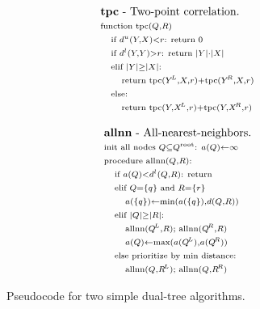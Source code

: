 \documentclass{article}
\newcommand{\disthrectmin}{d^{l}}
\newcommand{\disthrectmax}{d^{u}}
\newcommand{\dist}[2]{d(#1,#2)}
\newcommand{\kdroot}[1]{#1^{\text{\rm root}}}
\newcommand{\kdleft}[1]{#1^{\!L}}
\newcommand{\kdright}[1]{#1^{\!R}}
\newcommand{\X}{\\ \scriptstyle}
\newcommand{\x}{\\ \hspace{0.13in} \scriptstyle}
\newcommand{\xx}{\\ \hspace{0.26in} \scriptstyle}
\begin{document}
\begin{figure}
  \vspace{-1.89in}
  \hspace{1.8in}
  \begin{minipage}{3.88in}
    \begin{minipage}{1.8in}
      \begin{displaymath}
        \begin{array}{l}
          \text{{\bf tpc} - Two-point correlation.}
          \X \text{function tpc}(Q, R)
          \x \text{if }\disthrectmax(Y, X) < r\text{: return }0
          \x \text{if }\disthrectmin(Y, Y) > r\text{: return } |Y| \cdot |X|
          \x \text{elif }|Y| \geq |X|\text{:}
          \xx \text{return tpc}(\kdleft{Y}, X, r) + \text{tpc}(\kdright{Y}, X, r)
          \x \text{else:}
          \xx \text{return tpc}(Y, \kdleft{X}, r) + \text{tpc}(Y, \kdright{X}, r)
        \end{array}
       \end{displaymath}
       \vspace{-.11in}
       \caption{\label{fig:allnntpc}\footnotesize Pseudocode for two simple dual-tree algorithms.}
      \end{minipage}
      \begin{minipage}{2.0in}
       \begin{displaymath}
        \begin{array}{l}
          \text{{\bf allnn} - All-nearest-neighbors.}
          \X \text{init all nodes }Q \subseteq \kdroot{Q}\text{: }a(Q) \gets \infty
          \X \text{procedure allnn}(Q,R)\text{:}
          \x \text{if }a(Q) < \disthrectmin(Q, R)\text{: return}
          \x \text{elif }Q = \{q\} \text{ and } R = \{r\}
          \xx a(\{q\}) \gets \min(a(\{q\}), \dist{Q}{R})
          \x \text{elif }|Q| \geq |R|\text{:}
          \xx \text{allnn}(\kdleft{Q}, R); \text{ allnn}(\kdright{Q}, R)
          \xx a(Q) \gets \max(a(\kdleft{Q}), a(\kdright{Q}))
          \x \text{else prioritize by min distance:}
          \xx \text{allnn}(Q, \kdleft{R}); \text{ allnn}(Q, \kdright{R})
          \\
        \end{array}
       \end{displaymath}
      \end{minipage}

\end{minipage}
\end{figure}
\end{document}
